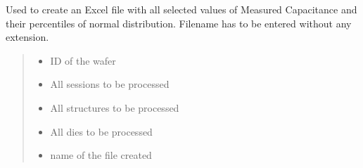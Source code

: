 \documentclass[letterpaper,10pt,english]{sphinxmanual}
\begin{document}
\begin{fulllineitems}
\label{\detokenize{excel:excel.excel_normal_Cmes}}
\pysigstartsignatures
{}
\pysigstopsignatures
\sphinxAtStartPar
Used to create an Excel file with all selected values of Measured Capacitance and their percentiles of normal distribution.
Filename has to be entered without any extension.
\begin{quote}\begin{description}
\begin{itemize}
\item {} 
\sphinxAtStartPar
{} \textendash{} ID of the wafer

\item {} 
\sphinxAtStartPar
{} \textendash{} All sessions to be processed

\item {} 
\sphinxAtStartPar
{} \textendash{} All structures to be processed

\item {} 
\sphinxAtStartPar
{} \textendash{} All dies to be processed

\item {} 
\sphinxAtStartPar
{} \textendash{} name of the file created

\end{itemize}

\end{description}\end{quote}

\end{fulllineitems}

\end{document}
